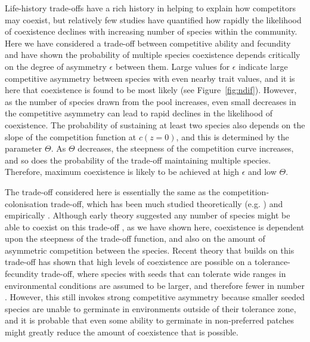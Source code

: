 Life-history trade-offs have a rich history in helping to explain how competitors may coexist, but relatively few studies have quantified how rapidly the likelihood of coexistence declines with increasing number of species within the community. Here we have considered a trade-off between competitive ability and fecundity and have shown the probability of multiple species coexistence depends critically on the degree of asymmetry $\epsilon$ between them. Large values for $\epsilon$ indicate large competitive asymmetry between species with even nearby trait values, and it is here that coexistence is found to be most likely (see Figure~\ref{fig:ndif}). However, as the number of species drawn from the pool increases, even small decreases in the competitive asymmetry can lead to rapid declines in the likelihood of coexistence. The probability of sustaining at least two species also depends on the slope of the competition function at $c(z=0)$, and this is determined by the parameter $\Theta$. As $\Theta$ decreases, the steepness of the competition curve increases, and so does the probability of the trade-off maintaining multiple species. Therefore, maximum coexistence is likely to be achieved at high $\epsilon$ and low $\Theta$.

The trade-off considered here is essentially the same as the competition-colonisation trade-off, which has been much studied theoretically (e.g.  \cite{levin1974disturbance, hastings1980disturbance, tilman1994competition}) and empirically \citep[e.g.][]{turnbull1999seed, robinson1995invasibility, cadotte2007competition}. Although early theory suggested any number of species might be able to coexist on this trade-off \citep{may1994superinfection, tilman1994competition}, as we have shown here, coexistence is dependent upon the steepness of the trade-off function, and also on the amount of asymmetric competition between the species. Recent theory that builds on this trade-off has shown that high levels of coexistence are possible on a tolerance-fecundity trade-off, where species with seeds that can tolerate wide ranges in environmental conditions are assumed to be larger, and therefore fewer in number \citep{muller2010tolerance}. However, this still invokes strong competitive asymmetry because smaller seeded species are unable to germinate in environments outside of their tolerance zone, and it is probable that even some ability to germinate in non-preferred patches might greatly reduce the amount of coexistence that is possible.

